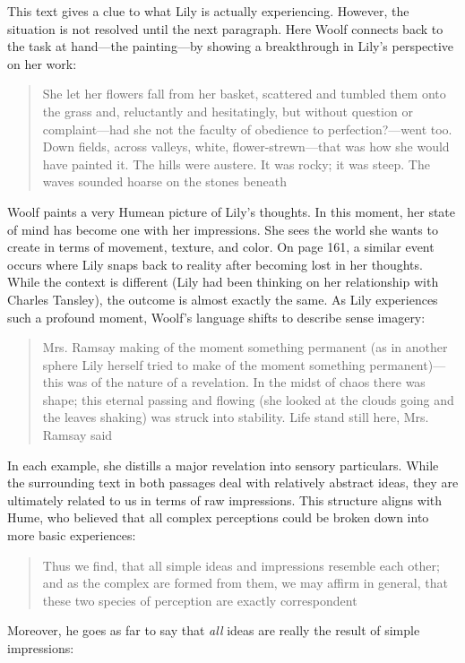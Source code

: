 This text gives a clue to what Lily is actually experiencing. However, the situation is not resolved until the next paragraph. Here Woolf connects back to the task at hand—the painting—by showing a breakthrough in Lily's perspective on her work:

\blockcquote[][201]{woolf_81}[.]{She let her flowers fall from her basket, scattered and tumbled them onto the grass and, reluctantly and hesitatingly, but without question or complaint—had she not the faculty of obedience to perfection?—went too. Down fields, across valleys, white, flower-strewn—that was how she would have painted it. The hills were austere. It was rocky; it was steep. The waves sounded hoarse on the stones beneath}

Woolf paints a very Humean picture of Lily's thoughts. In this moment, her state of mind has become one with her impressions. She sees the world she wants to create in terms of movement, texture, and color. On page 161, a similar event occurs where Lily snaps back to reality after becoming lost in her thoughts. While the context is different (Lily had been thinking on her relationship with Charles Tansley), the outcome is almost exactly the same. As Lily experiences such a profound moment, Woolf's language shifts to describe sense imagery:

\blockcquote[][161]{woolf_81}[.]{Mrs. Ramsay making of the moment something permanent (as in another sphere Lily herself tried to make of the moment something permanent)—this was of the nature of a revelation. In the midst of chaos there was shape; this eternal passing and flowing (she looked at the clouds going and the leaves shaking) was struck into stability. Life stand still here, Mrs. Ramsay said}

In each example, she distills a major revelation into sensory particulars. While the surrounding text in both passages deal with relatively abstract ideas, they are ultimately related to us in terms of raw impressions. This structure aligns with Hume, who believed that all complex perceptions could be broken down into more basic experiences: 

\blockcquote[][4]{hume_78}[.]{Thus we find, that all simple ideas and impressions resemble each other; and as the complex are formed from them, we may affirm in general, that these two species of perception are exactly correspondent}

Moreover, he goes as far to say that \emph{all} ideas are really the result of simple impressions:

